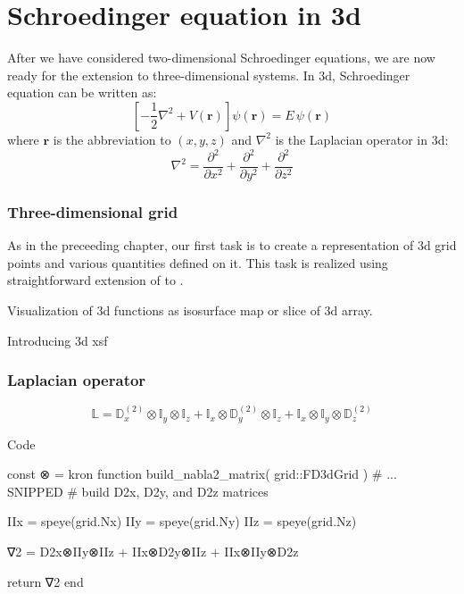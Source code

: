 \chapter{Schroedinger equation in 3d}

After we have considered two-dimensional Schroedinger equations, we are now ready for
the extension to three-dimensional systems. In 3d, Schroedinger equation can be
written as:
\begin{equation}
\left[ -\frac{1}{2}\nabla^2 + V(\mathbf{r}) \right] \psi(\mathbf{r}) = E\,\psi(\mathbf{r})
\end{equation}
where $\mathbf{r}$ is the abbreviation to $(x,y,z)$ and
%
$\nabla^2$ is the Laplacian operator in 3d:
\begin{equation}
\nabla^2 = \frac{\partial^2}{\partial x^2} + \frac{\partial^2}{\partial y^2} +
\frac{\partial^2}{\partial z^2}
\end{equation}

\subsection{Three-dimensional grid}

As in the preceeding chapter, our first task is to create a representation of 3d grid
points and various quantities defined on it. This task is realized using straightforward
extension of  to .


Visualization of 3d functions as isosurface map or slice of 3d array.

Introducing 3d xsf


\subsection{Laplacian operator}

\begin{equation}
\mathbb{L} = \mathbb{D}^{(2)}_{x} \otimes \mathbb{I}_{y} \otimes \mathbb{I}_{z} +
\mathbb{I}_{x} \otimes \mathbb{D}^{(2)}_{y} \otimes \mathbb{I}_{z} +
\mathbb{I}_{x} \otimes \mathbb{I}_{y} \otimes \mathbb{D}^{(2)}_{z}
\end{equation}


Code
\begin{juliacode}
const ⊗ = kron
function build_nabla2_matrix( grid::FD3dGrid )
    # ... SNIPPED
    # build D2x, D2y, and D2z matrices
    
    IIx = speye(grid.Nx)
    IIy = speye(grid.Ny)
    IIz = speye(grid.Nz)
    
    ∇2 = D2x⊗IIy⊗IIz + IIx⊗D2y⊗IIz + IIx⊗IIy⊗D2z 
    
    return ∇2
end
\end{juliacode}

